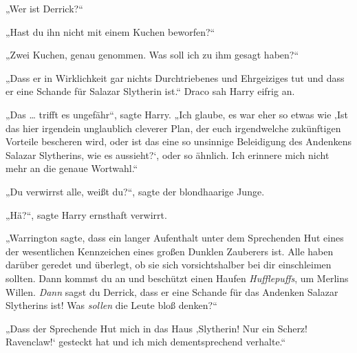 „Wer ist Derrick?“

„Hast du ihn nicht mit einem Kuchen beworfen?“

„Zwei Kuchen, genau genommen. Was soll ich zu ihm gesagt haben?“

„Dass er in Wirklichkeit gar nichts Durchtriebenes und Ehrgeiziges tut und dass er eine Schande für Salazar Slytherin ist.“ Draco sah Harry eifrig an.

„Das … trifft es ungefähr“, sagte Harry.
„Ich glaube, es war eher so etwas wie ‚Ist das hier irgendein unglaublich cleverer Plan, der euch irgendwelche zukünftigen Vorteile bescheren wird, oder ist das eine so unsinnige Beleidigung des Andenkens Salazar Slytherins, wie es aussieht?‘, oder so ähnlich. Ich erinnere mich nicht mehr an die genaue Wortwahl.“

„Du verwirrst alle, weißt du?“, sagte der blondhaarige Junge.

„Hä?“, sagte Harry ernsthaft verwirrt.

„Warrington sagte, dass ein langer Aufenthalt unter dem Sprechenden Hut eines der wesentlichen Kennzeichen eines großen Dunklen Zauberers ist. Alle haben darüber geredet und überlegt, ob sie sich vorsichtshalber bei dir einschleimen sollten. Dann kommst du an und beschützt einen Haufen \emph{Hufflepuffs}, um Merlins Willen. \emph{Dann} sagst du Derrick, dass er eine Schande für das Andenken Salazar Slytherins ist! Was \emph{sollen} die Leute bloß denken?“

„Dass der Sprechende Hut mich in das Haus ‚Slytherin! Nur ein Scherz! Ravenclaw!‘ gesteckt hat und ich mich dementsprechend verhalte.“

